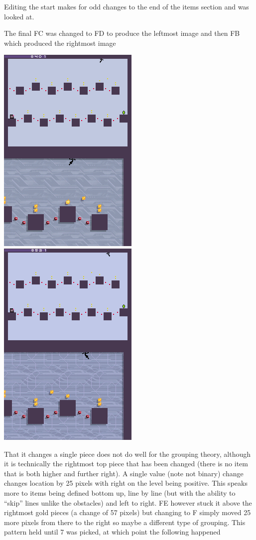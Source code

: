 \documentclass[
]{book}
\begin{document}
Editing the start makes for odd changes to the end of the items section and was looked at.

The final FC was changed to FD to produce the leftmost image and then FB which produced the rightmost image

\includegraphics{images/183_home_fast6191_romhackingguide_unrenamed_fil___rs_romhackingguideleveleditingworkedNplus16.png}\includegraphics{images/184_home_fast6191_romhackingguide_unrenamed_fil___rs_romhackingguideleveleditingworkedNplus17.png}

That it changes a single piece does not do well for the grouping theory, although it is technically the rightmost top piece that has been changed (there is no item that is both higher and further right). A single value (note not binary) change changes location by 25 pixels with right on the level being positive. This speaks more to items being defined bottom up, line by line (but with the ability to ``skip'' lines unlike the obstacles) and left to right. FE however stuck it above the rightmost gold pieces (a change of 57 pixels) but changing to F simply moved 25 more pixels from there to the right so maybe a different type of grouping. This pattern held until 7 was picked, at which point the following happened
\end{document}
